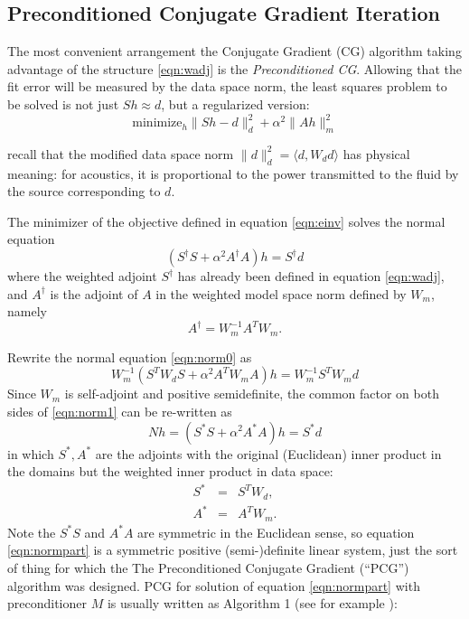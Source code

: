 \documentclass[georeport,12pt]{geophysics}
\begin{document}
\subsection{Preconditioned Conjugate Gradient Iteration}

The most convenient arrangement the Conjugate Gradient (CG) algorithm
taking advantage of the structure \ref{eqn:wadj} is the {\em
  Preconditioned CG}. Allowing that the fit error will be measured by
the data space norm, the least squares problem to be solved is not
just $Sh \approx d$, but a regularized version:
\begin{equation}
  \label{eqn:einv}
  \mbox{minimize}_h \|Sh-d\|^2_d + \alpha^2 \|Ah\|^2_m
\end{equation}

 recall that the modified data space norm $\|d\|_d^2 = \langle
d, W_d d\rangle$ has physical meaning: for acoustics, it is
proportional to the power transmitted to the fluid by the source
corresponding to $d$. 

The minimizer of the objective defined in equation \ref{eqn:einv}
solves the normal equation
\begin{equation}
  \label{eqn:norm0}
  (S^{\dagger}S + \alpha^2 A^{\dagger}A)h = S^{\dagger}d 
\end{equation}
where the weighted adjoint $S^{\dagger}$ has already been defined in equation \ref{eqn:wadj}, and $A^{\dagger}$ is the adjoint of $A$ in the weighted model space norm defined by $W_m$, namely
\begin{equation}
  \label{eqn:aadj}
  A^{\dagger} = W_m^{-1}A^TW_m.
\end{equation}

Rewrite the normal equation \ref{eqn:norm0} as
\begin{equation}
  \label{eqn:norm1}
  W_m^{-1}(S^TW_dS + \alpha^2 A^TW_mA)h = W_m^{-1}S^TW_md 
\end{equation}
Since $W_m$ is self-adjoint and positive semidefinite, the common factor on both sides of \ref{eqn:norm1} can be re-written as
\begin{equation}
  \label{eqn:normpart}
  Nh = (S^*S + \alpha^2 A^*A)h = S^*d 
\end{equation}
in which $S^*, A^*$ are the adjoints with the original (Euclidean)
inner product in the domains but the weighted inner product in data
space:
\begin{eqnarray}
  \label{eqn:sadjwt}
  S^* &=& S^T W_d,\\
  A^* &=& A^T W_m.
\end{eqnarray}
Note the $S^*S$ and $A^*A$ are symmetric in the Euclidean sense, so
equation \ref{eqn:normpart} is a symmetric positive (semi-)definite
linear system, just the sort of thing for which the 
The Preconditioned Conjugate Gradient (``PCG'') algorithm was
designed. PCG for solution
of equation \ref{eqn:normpart} with preconditioner $M$ is usually
written as Algorithm 1 (see for example \cite{Golub:2012}):
\end{document}
